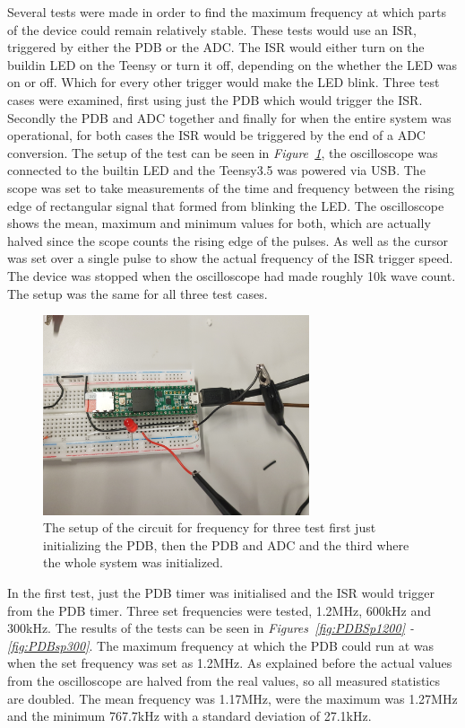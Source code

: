 Several tests were made in order to find the maximum frequency at which parts of the device could remain relatively stable.
These tests would use an ISR, triggered by either the PDB or the ADC.
The ISR would either turn on the buildin LED on the Teensy or turn it off, depending on the whether the LED was on or off.
Which for every other trigger would make the LED blink.
Three test cases were examined, first using just the PDB which would trigger the ISR. 
Secondly the PDB and ADC together and finally for when the entire system was operational, for both cases the ISR would be triggered by the end of a ADC conversion.
The setup of the test can be seen in \textit{Figure~\ref{fig:SetupCircSpeed}}, the oscilloscope was connected to the builtin LED and the Teensy3.5 was powered via USB.
The scope was set to take measurements of the time and frequency between the rising edge of rectangular signal that formed from blinking the LED. 
The oscilloscope shows the mean, maximum and minimum values for both, which are actually halved since the scope counts the rising edge of the pulses.
As well as the cursor was set over a single pulse to show the actual frequency of the ISR trigger speed.
The device was stopped when the oscilloscope had made roughly 10k wave count.
The setup was the same for all three test cases.


\begin{figure}[h]
    \centering
    \includegraphics[width=0.7\textwidth]{graphics/SetupCircSpeed.jpg}
    \caption{The setup of the circuit for frequency for three test first just initializing the PDB, then the PDB and ADC and the third where the whole system was initialized.}
    \label{fig:SetupCircSpeed}
\end{figure}

In the first test, just the PDB timer was initialised and the ISR would trigger from the PDB timer.
Three set frequencies were tested, 1.2MHz, 600kHz and 300kHz.
The results of the tests can be seen in \textit{Figures~\ref{fig:PDBSp1200} - \ref{fig:PDBsp300}}.
The maximum frequency at which the PDB could run at was when the set frequency was set as 1.2MHz.
As explained before the actual values from the oscilloscope are halved from the real values, so all measured statistics are doubled.
The mean frequency was 1.17MHz, were the maximum was 1.27MHz and the minimum 767.7kHz with a standard deviation of 27.1kHz. 

